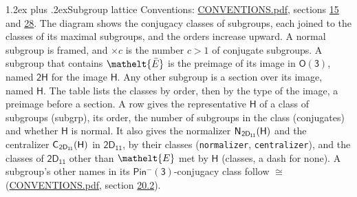 \documentclass[10pt,a4paper]{article}
\makeatletter
\renewcommand\section{\@startsection{section}{1}{\z@}{-3ex plus -1ex minus -.2ex}%
  {1.2ex plus .2ex}{\normalfont\large\sffamily\bfseries\color{parttitle}}}
\numberwithin{equation}{section}
\newcommand{\eltfont}[1]{{\let\sigma\eltsigma\mathelt{#1}}}
\newcommand{\grp}[1]{\mathsf{#1}}
\newcommand{\cls}[1]{\eltfont{#1}}
\newcommand{\elt}[1]{\eltfont{#1}}
\newcommand{\samecls}{\cong}
\newcommand{\nconj}[1]{{\scriptsize$\times#1$}}
\newcommand{\barred}[1]{\bar{#1}}
\newcommand{\hairsp}{\mkern1mu}
\makeatother
\begin{document}
\section{Subgroup lattice}\label{s:subgroups}
Conventions: \href{../../CONVENTIONS.pdf}{CONVENTIONS.pdf}, sections \href{../../../rotation/CONVENTIONS.pdf\#conv.15}{15} and \href{../../CONVENTIONS.pdf\#conv.28}{28}.
The diagram shows the conjugacy classes of subgroups, each joined to the classes of its maximal subgroups, and the orders increase upward. A normal subgroup is framed, and ${\times}c$ is the number $c > 1$ of conjugate subgroups. \label{n:group.H}A subgroup that contains $\elt{\barred{E}}$ is the preimage of its image in $\grp{O(3)}$, named $\grp{2H}$ for the image $\grp{H}$. Any other subgroup is a section over its image, named $\grp{H}$. The table lists the classes by order, then by the type of the image, a preimage before a section. \label{n:head.subgroup}\label{n:head.order}\label{n:head.conjugates}\label{n:head.normal}A row gives the representative $\grp{H}$ of a class of subgroups (subgrp), its order, the number of subgroups in the class (conjugates) and whether $\grp{H}$ is normal. \label{n:group.normalizer}\label{n:group.centralizer}\label{n:head.classes}It also gives the normalizer $\grp{N}_{\hairsp \grp{2D_{11}}}(\grp{H})$ and the centralizer $\grp{C}_{\hairsp \grp{2D_{11}}}(\grp{H})$ in $\grp{2D_{11}}$, by their classes (\texttt{normalizer}, \texttt{centralizer}), and the classes of $\grp{2D_{11}}$ other than $\cls{E}$ met by $\grp{H}$ (classes, a dash for none). A subgroup's other names in its \href{Pinminus3.pdf}{$\grp{Pin^{-}(3)}$}-conjugacy class follow $\samecls$ (\href{../../CONVENTIONS.pdf}{CONVENTIONS.pdf}, section \href{../../CONVENTIONS.pdf\#conv.20.2}{20.2}).
\begin{center}
\end{center}
\end{document}
